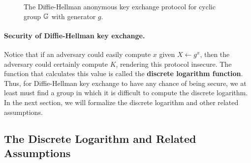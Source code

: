 \begin{figure}[H]
	\center
	\caption{The Diffie-Hellman anonymous key exchange protocol for cyclic group $\mathbb{G}$ with generator $g$.}
	\label{fig:DHKE}
\end{figure}

\paragraph{Security of Diffie-Hellman key exchange.} Notice that if an adversary could easily compute $x$ given $X \gets g^x$, then the adversary could certainly compute $K$, rendering this protocol insecure. The function that calculates this value is called the \textbf{discrete logarithm function}. Thus, for Diffie-Hellman key exchange to have any chance of being secure, we at least must find a group in which it is difficult to compute the discrete logarithm. In the next section, we will formalize the discrete logarithm and other related assumptions.

\subsection{The Discrete Logarithm and Related Assumptions}

